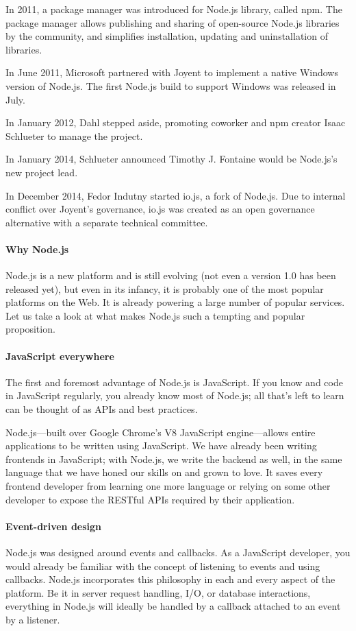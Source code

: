 In 2011, a package manager was introduced for Node.js library, called npm. The package manager allows publishing and sharing of open-source Node.js libraries by the community, and simplifies installation, updating and uninstallation of libraries.

In June 2011, Microsoft partnered with Joyent to implement a native Windows version of Node.js. The first Node.js build to support Windows was released in July.

In January 2012, Dahl stepped aside, promoting coworker and npm creator Isaac Schlueter to manage the project.

In January 2014, Schlueter announced Timothy J. Fontaine would be Node.js's new project lead.

In December 2014, Fedor Indutny started io.js, a fork of Node.js. Due to internal conflict over Joyent's governance, io.js was created as an open governance alternative with a separate technical committee.

\paragraph*{Why Node.js}
\hfill \break
Node.js is a new platform and is still evolving (not even a version 1.0 has been
released yet), but even in its infancy, it is probably one of the most popular platforms
on the Web. It is already powering a large number of popular services. Let us take a
look at what makes Node.js such a tempting and popular proposition.

\paragraph*{JavaScript everywhere}
\hfill \break
The first and foremost advantage of Node.js is JavaScript. If you know and code in
JavaScript regularly, you already know most of Node.js; all that's left to learn can be
thought of as APIs and best practices.

Node.js—built over Google Chrome's V8 JavaScript engine—allows entire
applications to be written using JavaScript. We have already been writing frontends
in JavaScript; with Node.js, we write the backend as well, in the same language that
we have honed our skills on and grown to love. It saves every frontend developer
from learning one more language or relying on some other developer to expose the
RESTful APIs required by their application.

\paragraph*{Event-driven design}
\hfill \break
Node.js was designed around events and callbacks. As a JavaScript developer, you
would already be familiar with the concept of listening to events and using callbacks.
Node.js incorporates this philosophy in each and every aspect of the platform. Be it
in server request handling, I/O, or database interactions, everything in Node.js will
ideally be handled by a callback attached to an event by a listener.

